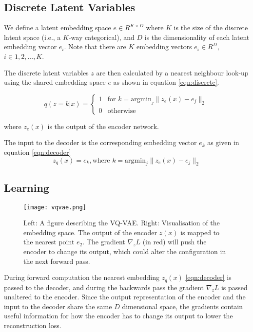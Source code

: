  \subsection{Discrete Latent Variables}
 We define a latent embedding space $e \in R^{K \times D}$ where $K$ is the size of the discrete latent space 
 (i.e., a $K$-way categorical), and $D$ is the dimensionality of each latent embedding vector $e_{i}$.
 Note that there are $K$ embedding vectors $e_{i} \in R ^D$, $i\in{1, 2, ..., K}$.

 The discrete latent variables $z$ are then calculated by a nearest 
 neighbour look-up using the shared embedding space $e$ as shown in equation \ref{eqn:discrete}.

 \begin{equation}
    q(z = k|x) =
    \begin{cases}
        1 & \text{for } k = \text{argmin}_{j} \| z_{e}(x) - e_{j} \|_{2} \\
        0 & \text{otherwise}
    \end{cases}
    \label{eqn:discrete}
 \end{equation} 

 where $z _e(x)$ is the output of the encoder network.

 The input to the decoder is the corresponding embedding vector $e _k$ as given in equation \ref{eqn:decoder}
 \begin{equation}
     z _q(x) = e _k, \text{where } k= \text{argmin} _j \| z _e(x) - e _j \| _2
     \label{eqn:decoder}
 \end{equation}

\subsection{Learning}

\begin{figure}[h]
    \begin{center}
        \texttt{[image: vqvae.png]}
    \end{center}
    \caption{Left: A figure describing the VQ-VAE. Right: Visualisation of the embedding space. The
    output of the encoder $z(x)$ is mapped to the nearest point $e _2$. The gradient $\nabla _z L$ (in red) will push the
    encoder to change its output, which could alter the configuration in the next forward pass.}
    \label{fig:vqvae}
\end{figure}

During forward computation the nearest embedding $z _q(x)$ \ref{eqn:decoder} is passed to the decoder,
 and during the backwards pass the gradient $\nabla _z L$ is passed unaltered to the encoder. 
 Since the output representation of the encoder and the input to the decoder share the same $D$
 dimensional space, the gradients contain useful information for how the encoder has to change its 
 output to lower the reconstruction loss.

